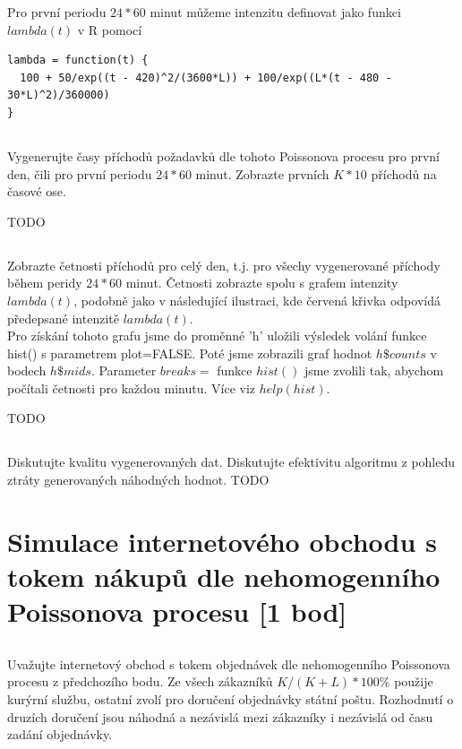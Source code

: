 \documentclass[a4paper]{article}
\begin{document}
Pro první periodu $24*60$ minut můžeme intenzitu definovat jako funkci $lambda(t)$ v R pomocí

\lstset{title=Vstup, language=r}
\begin{lstlisting}
lambda = function(t) {
  100 + 50/exp((t - 420)^2/(3600*L)) + 100/exp((L*(t - 480 - 30*L)^2)/360000)
}
\end{lstlisting}

\subsection{}
Vygenerujte časy příchodů požadavků dle tohoto Poissonova procesu pro první den, čili pro první periodu $24*60$ minut. Zobrazte prvních $K*10$ příchodů na časové ose.

\vspace{1cm}
TODO

\subsection{}
Zobrazte četnosti příchodů pro celý den, t.j. pro všechy vygenerované příchody během peridy $24*60$ minut. Četnosti zobrazte spolu s grafem intenzity $lambda(t)$, podobně jako v následující ilustraci, kde červená křivka odpovídá předepsané intenzitě $lambda(t)$.
\\
Pro získání tohoto grafu jsme do proměnné 'h' uložili výsledek volání funkce hist() s parametrem plot=FALSE. Poté jsme zobrazili graf hodnot $h\$counts$ v bodech $h\$mids$. Parameter $breaks=$ funkce $hist()$ jsme zvolili tak, abychom počítali četnosti pro každou minutu. Více viz $help(hist)$.

\vspace{1cm}
TODO

\subsection{}
Diskutujte kvalitu vygenerovaných dat. Diskutujte efektivitu algoritmu z pohledu ztráty generovaných náhodných hodnot.
TODO


\section{Simulace internetového obchodu s tokem nákupů dle nehomogenního Poissonova procesu  [1 bod]}
\subsection{}
Uvažujte internetový obchod s tokem objednávek dle nehomogenního Poissonova procesu z předchozího bodu. Ze všech zákazníků $K/(K+L)*100\%$ použije kurýrní službu, ostatní zvolí pro doručení objednávky státní poštu. Rozhodnutí o druzích doručení jsou náhodná a nezávislá mezi zákazníky i nezávislá od času zadání objednávky.
\end{document}

